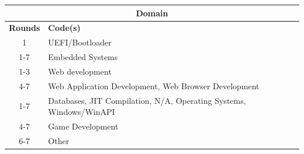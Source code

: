 \centering
\small
\begin{tabular}{|cp{10cm}|}
\hline
\multicolumn{2}{|c|}{\textbf{Domain}}                                                                      \\ \hline
\multicolumn{1}{|c|}{\textbf{Rounds}} & \textbf{Code(s)}                                                   \\ \hline
\multicolumn{1}{|c|}{1}               & UEFI/Bootloader                                                    \\ \cline{2-2} 
\multicolumn{1}{|c|}{1-7}             & Embedded Systems                                                   \\ \hline
\multicolumn{1}{|c|}{1-3}             & Web development                                                    \\ \cline{2-2} 
\multicolumn{1}{|c|}{4-7}             & Web Application Development, Web Browser Development               \\ \hline
\multicolumn{1}{|c|}{1-7}             & Databases, JIT Compilation, N/A, Operating Systems, Windows/WinAPI \\ \hline
\multicolumn{1}{|c|}{4-7}             & Game Development                                                   \\ \hline
\multicolumn{1}{|c|}{6-7}             & Other                                                              \\ \hline
\end{tabular}
